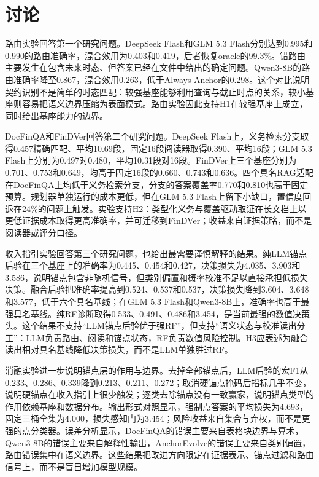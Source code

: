 \section{讨论}

路由实验回答第一个研究问题。DeepSeek Flash和GLM 5.3 Flash分别达到0.995和0.990的路由准确率，混合效用为0.403和0.419，后者恢复oracle的99.3\%。错路由主要发生在包含未来时态、但答案已经在文件中给出的确定问题。Qwen3-8B的路由准确率降至0.867，混合效用0.263，低于Always-Anchor的0.298。这个对比说明契约识别不是简单的时态匹配：较强基座能够利用查询与截止时点的关系，较小基座则容易把语义边界压缩为表面模式。路由实验因此支持H1在较强基座上成立，同时给出基座能力的边界。

DocFinQA和FinDVer回答第二个研究问题。DeepSeek Flash上，义务检索分支取得0.457精确匹配、平均10.69段，固定16段阅读器取得0.390、平均16段；GLM 5.3 Flash上分别为0.497对0.480，平均10.31段对16段。FinDVer上三个基座分别为0.701、0.753和0.649，均高于固定16段的0.660、0.743和0.636。四个具名RAG适配在DocFinQA上均低于义务检索分支，分支的答案覆盖率0.770和0.810也高于固定预算。规划器单独运行的成本更低，但在GLM 5.3 Flash上留下小缺口，置信度回退在24\%的问题上触发。实验支持H2：类型化义务与覆盖驱动取证在长文档上以更低证据成本取得更高准确率，并可迁移到FinDVer；收益来自证据策略，而不是阅读器或评分口径。

收入指引实验回答第三个研究问题，也给出最需要谨慎解释的结果。纯LLM锚点后验在三个基座上的准确率为0.445、0.454和0.427，决策损失为4.035、3.903和3.586，说明锚点包含非随机信号，但类别偏置和概率校准不足以直接承担低损失决策。融合后验把准确率提高到0.524、0.537和0.537，决策损失降到3.604、3.648和3.577，低于六个具名基线；在GLM 5.3 Flash和Qwen3-8B上，准确率也高于最强具名基线。纯RF诊断取得0.533、0.491、0.486和3.454，是当前最强的数值决策头。这个结果不支持“LLM锚点后验优于强RF”，但支持“语义状态与校准读出分工”：LLM负责路由、阅读和锚点状态，RF负责数值风险控制。H3应表述为融合读出相对具名基线降低决策损失，而不是LLM单独胜过RF。

消融实验进一步说明锚点层的作用与边界。去掉全部锚点后，LLM后验的宏F1从0.233、0.286、0.339降到0.213、0.211、0.272；取消硬锚点掩码后指标几乎不变，说明硬锚点在收入指引上很少触发；逐类去除锚点没有一致赢家，说明锚点类型的作用依赖基座和数据分布。输出形式对照显示，强制点答案的平均损失为4.693，固定三桶全集为4.000，损失感知门为3.454；风险收益来自集合与弃权，而不是更强的点分类器。误差分析显示，DocFinQA的错误主要来自表格块边界与算术，Qwen3-8B的错误主要来自解释性输出，AnchorEvolve的错误主要来自类别偏置，路由错误集中在语义边界。这些结果把改进方向限定在证据表示、锚点过滤和路由信号上，而不是盲目增加模型规模。

